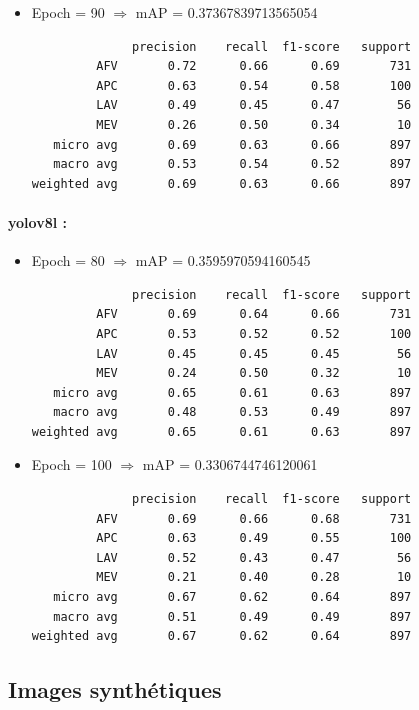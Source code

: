\begin{itemize}
    \item Epoch = 90 $\Rightarrow$ mAP = 0.37367839713565054
          \begin{verbatim}
              precision    recall  f1-score   support
         AFV       0.72      0.66      0.69       731
         APC       0.63      0.54      0.58       100
         LAV       0.49      0.45      0.47        56
         MEV       0.26      0.50      0.34        10
   micro avg       0.69      0.63      0.66       897
   macro avg       0.53      0.54      0.52       897
weighted avg       0.69      0.63      0.66       897
    \end{verbatim}
\end{itemize}

\paragraph{yolov8l :}
\begin{itemize}
    \item Epoch = 80 $\Rightarrow$ mAP = 0.3595970594160545
          \begin{verbatim}
              precision    recall  f1-score   support
         AFV       0.69      0.64      0.66       731
         APC       0.53      0.52      0.52       100
         LAV       0.45      0.45      0.45        56
         MEV       0.24      0.50      0.32        10
   micro avg       0.65      0.61      0.63       897
   macro avg       0.48      0.53      0.49       897
weighted avg       0.65      0.61      0.63       897
    \end{verbatim}

    \item Epoch = 100 $\Rightarrow$ mAP = 0.3306744746120061
          \begin{verbatim}
              precision    recall  f1-score   support
         AFV       0.69      0.66      0.68       731
         APC       0.63      0.49      0.55       100
         LAV       0.52      0.43      0.47        56
         MEV       0.21      0.40      0.28        10
   micro avg       0.67      0.62      0.64       897
   macro avg       0.51      0.49      0.49       897
weighted avg       0.67      0.62      0.64       897
    \end{verbatim}
\end{itemize}


\subsection{Images synthétiques}

